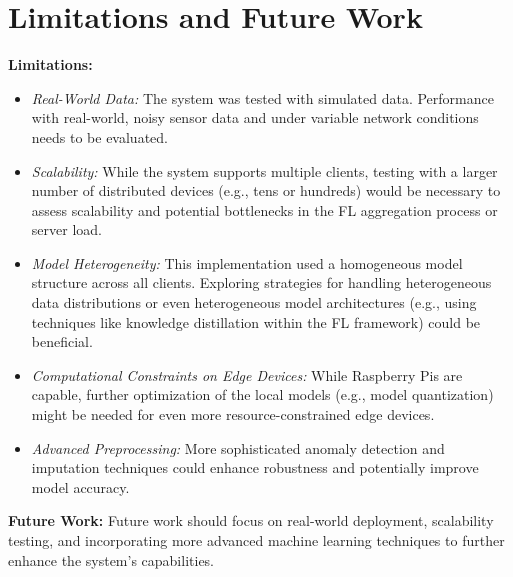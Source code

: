 \section{Limitations and Future Work} %
\label{sec:limitations_future_work}
\textbf{Limitations:}
\begin{itemize}
    \item \textit{Real-World Data:} The system was tested with simulated data. Performance with real-world, noisy sensor data and under variable network conditions needs to be evaluated.
    \item \textit{Scalability:} While the system supports multiple clients, testing with a larger number of distributed devices (e.g., tens or hundreds) would be necessary to assess scalability and potential bottlenecks in the FL aggregation process or server load.
    \item \textit{Model Heterogeneity:} This implementation used a homogeneous model structure across all clients. Exploring strategies for handling heterogeneous data distributions or even heterogeneous model architectures (e.g., using techniques like knowledge distillation within the FL framework) could be beneficial.
    \item \textit{Computational Constraints on Edge Devices:} While Raspberry Pis are capable, further optimization of the local models (e.g., model quantization) might be needed for even more resource-constrained edge devices.
    \item \textit{Advanced Preprocessing:} More sophisticated anomaly detection and imputation techniques could enhance robustness and potentially improve model accuracy.
\end{itemize}

\textbf{Future Work:}
Future work should focus on real-world deployment, scalability testing, and incorporating more advanced machine learning techniques to further enhance the system's capabilities.


